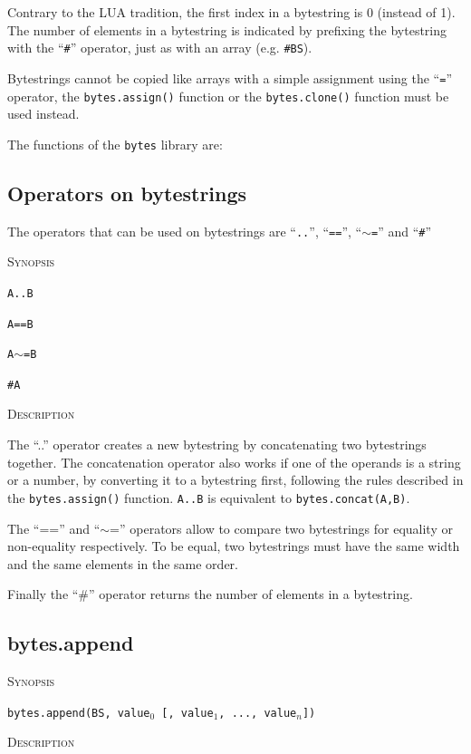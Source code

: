 \documentclass[11pt]{report}
\newcommand{\mansection}[1]{\vspace{0.5em}\par\noindent\textsc{#1}\vspace{0.5em}\par}
\newcommand{\syn}[1]{\texttt{#1}}
\begin{document}
Contrary to the LUA tradition, the first index in a bytestring is 0
(instead of 1). The number of elements in a bytestring is indicated 
by prefixing the bytestring with the ``\syn{\#}'' operator, just as 
with an array (e.g. \syn{\#BS}).

Bytestrings cannot be copied like arrays with a simple assignment 
using the ``\syn{=}'' operator, the \syn{bytes.assign()} function
or the \syn{bytes.clone()} function must be used instead.  

The functions of the \syn{bytes} library are:

\subsection{Operators on bytestrings}
  
The operators that can be used on bytestrings are ``\syn{..}'', ``\syn{==}'', ``\syn{$\sim$=}'' and ``\syn{\#}''

\mansection{Synopsis}

\syn{A..B} 

\syn{A==B}

\syn{A$\sim$=B}

\syn{\#A}

\mansection{Description}
  
The ``..'' operator creates a new bytestring by concatenating two bytestrings together.
The concatenation operator also works if one of the operands is a string or a number, 
by converting it to a bytestring first, following the rules described in the 
\syn{bytes.assign()} function. 
\syn{A..B} is equivalent to \syn{bytes.concat(A,B)}.
  
The ``=='' and ``$\sim$='' operators allow to compare two bytestrings for equality or
non-equality respectively. To be equal, two bytestrings must have the same width
and the same elements in the same order.
 
Finally the ``\#'' operator returns the number of elements in a bytestring.

\subsection{bytes.append}

\mansection{Synopsis}

\syn{bytes.append(BS, value$_0$ [, value$_1$, ..., value$_n$])}

\mansection{Description}
\end{document}
